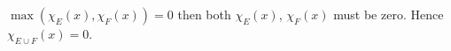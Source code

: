 \documentclass[preview]{standalone}
\begin{document}
\begin{center}
$\max(\chi_{E}(x),\chi_{F}(x)) = 0$ then both $\chi_{E}(x)$, $\chi_{F}(x)$ must be zero. Hence $\chi_{E \cup F}(x)=0$.
\end{center}
\end{document}
